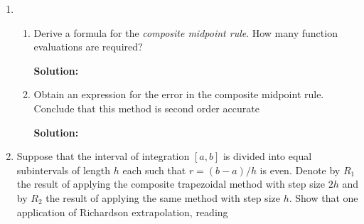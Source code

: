 \documentclass[12pt]{article}
\newcommand{\abs}[1]{\left| #1 \right|}
\begin{document}
\begin{enumerate}
\begin{enumerate}
\begin{align*}
E(f) = \frac{f^{(4)}(\eta)}{4!} \cdot \frac{4(b-a)^{5}}{5!} = \frac{f^{(4)}(\eta)(a - b)^{5}}{720}
\end{align*}

\item Use the basic corrected trapezoidal rule to evaluate approximations for $\int_{0}^{1}e^{x}\text{d}x$ and $\int_{0.9}^{1}e^{x}\text{d}x$. Compare errors to those of Example 15.2. What are your observations?

{\bf Solution:}

\begin{align*}
I_{f} &= \frac{b-a}{2}(f(a) + f(b)) + \frac{(b-a)^{2}}{12}(f^{\prime}(a) - f^{\prime}(b))
\intertext{For $a=0$ and $b=1$}
I_{f} &= \frac{1}{2}(1 + e) + \frac{1}{12}(1-e) = 1.7160\\
\intertext{For $a = 0.9$ and $b = 1$}
I_{f} &= \frac{1}{2}\left( e^{0.9} + e\right) + \frac{1}{12}\left( e^{0.9} - e\right) = 2.5674
\intertext{According to Example 15.2, the actual value is given, so we can find the error by the corrected trapezoidal rule, for $a = 0$ and $b = 1$}
E(f) &= \abs{1.7183 - 1.7160} = 0.0023\\
\intertext{for $a = 0.9$ and $b = 1$}
E(f) &= \abs{1.7183 - 2.5674} = 0.8491
\end{align*}

In $[0,1]$, the corrected trapezoidal rule is more accurate than the regular trapezoidal rule and the midpoint rule, though it still underperforms when compared to Simpson's rule ($\xi = 0.0006$). However, in $[0.9, 1]$ all of the methods are more accurate than the corrected trapezoidal rule.

\end{enumerate}

\item 

\begin{enumerate}
\item Derive a formula for the {\em composite midpoint rule}. How many function evaluations are required?

{\bf Solution:}

\item Obtain an expression for the error in the composite midpoint rule. Conclude that this method is second order accurate

{\bf Solution:}
\end{enumerate}

\item Suppose that the interval of integration $[a, b]$ is divided into equal subintervals of length $h$ each such that $r = (b - a)/h$ is even. Denote by $R_{1}$ the result of applying the composite trapezoidal method with step size $2h$ and by $R_{2}$ the result of applying the same method with step size $h$. Show that one application of Richardson extrapolation, reading 


\end{enumerate}
\end{document}
